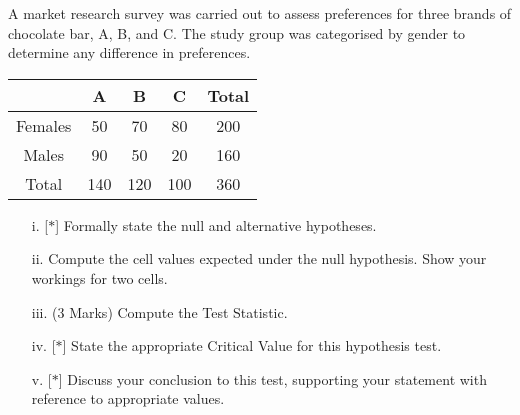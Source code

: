 \documentclass[a4paper,12pt]{article}
\begin{document}
A market research survey was carried out to assess preferences for three brands of chocolate bar, A, B, and C. 
The study group was categorised by gender to determine any difference in preferences.


{
	\large
	\begin{center}
		\begin{tabular}{|c|c|c|c|c|}
			\hline
			& A & B & C &  Total\\ \hline
			Females & 50 & 70 & 80 & 200 \\ \hline
			Males   & 90 & 50 & 20 &  160\\ \hline
			Total & 140 & 120 & 100 & 360\\ \hline
		\end{tabular} 
	\end{center}
}
\begin{itemize}
	\item[i.][$\ast$] Formally state the null and alternative hypotheses.
	\item[ii.]  Compute the cell values expected under the null hypothesis. Show your workings for two cells.
	\item[iii.](3 Marks) Compute the Test Statistic.
	\item[iv.][$\ast$] State the appropriate Critical Value for this hypothesis test.
	\item[v.][$\ast$] Discuss your conclusion to this test, supporting your statement with reference to appropriate values.
\end{itemize}



\newpage
\end{document}
